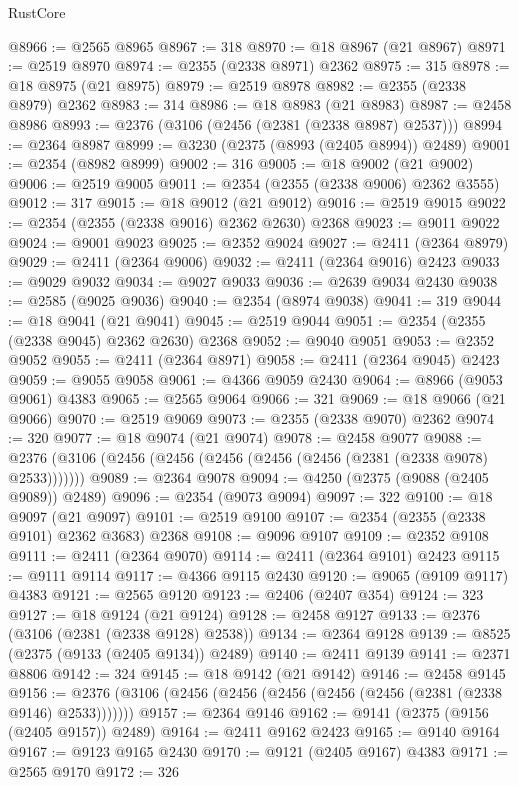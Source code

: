 \begin{lexlean}{RustCore}
\begin{coremodule}
@8966 := @2565 @8965
@8967 := 318
@8970 := @18 @8967 (@21 @8967)
@8971 := @2519 @8970
@8974 := @2355 (@2338 @8971) @2362
@8975 := 315
@8978 := @18 @8975 (@21 @8975)
@8979 := @2519 @8978
@8982 := @2355 (@2338 @8979) @2362
@8983 := 314
@8986 := @18 @8983 (@21 @8983)
@8987 := @2458 @8986
@8993 := @2376 (@3106 (@2456 (@2381 (@2338 @8987) @2537)))
@8994 := @2364 @8987
@8999 := @3230 (@2375 (@8993 (@2405 @8994)) @2489)
@9001 := @2354 (@8982 @8999)
@9002 := 316
@9005 := @18 @9002 (@21 @9002)
@9006 := @2519 @9005
@9011 := @2354 (@2355 (@2338 @9006) @2362 @3555)
@9012 := 317
@9015 := @18 @9012 (@21 @9012)
@9016 := @2519 @9015
@9022 := @2354 (@2355 (@2338 @9016) @2362 @2630) @2368
@9023 := @9011 @9022
@9024 := @9001 @9023
@9025 := @2352 @9024
@9027 := @2411 (@2364 @8979)
@9029 := @2411 (@2364 @9006)
@9032 := @2411 (@2364 @9016) @2423
@9033 := @9029 @9032
@9034 := @9027 @9033
@9036 := @2639 @9034 @2430
@9038 := @2585 (@9025 @9036)
@9040 := @2354 (@8974 @9038)
@9041 := 319
@9044 := @18 @9041 (@21 @9041)
@9045 := @2519 @9044
@9051 := @2354 (@2355 (@2338 @9045) @2362 @2630) @2368
@9052 := @9040 @9051
@9053 := @2352 @9052
@9055 := @2411 (@2364 @8971)
@9058 := @2411 (@2364 @9045) @2423
@9059 := @9055 @9058
@9061 := @4366 @9059 @2430
@9064 := @8966 (@9053 @9061) @4383
@9065 := @2565 @9064
@9066 := 321
@9069 := @18 @9066 (@21 @9066)
@9070 := @2519 @9069
@9073 := @2355 (@2338 @9070) @2362
@9074 := 320
@9077 := @18 @9074 (@21 @9074)
@9078 := @2458 @9077
@9088 := @2376 (@3106 (@2456 (@2456 (@2456 (@2456 (@2456 (@2381 (@2338 @9078) @2533)))))))
@9089 := @2364 @9078
@9094 := @4250 (@2375 (@9088 (@2405 @9089)) @2489)
@9096 := @2354 (@9073 @9094)
@9097 := 322
@9100 := @18 @9097 (@21 @9097)
@9101 := @2519 @9100
@9107 := @2354 (@2355 (@2338 @9101) @2362 @3683) @2368
@9108 := @9096 @9107
@9109 := @2352 @9108
@9111 := @2411 (@2364 @9070)
@9114 := @2411 (@2364 @9101) @2423
@9115 := @9111 @9114
@9117 := @4366 @9115 @2430
@9120 := @9065 (@9109 @9117) @4383
@9121 := @2565 @9120
@9123 := @2406 (@2407 @354)
@9124 := 323
@9127 := @18 @9124 (@21 @9124)
@9128 := @2458 @9127
@9133 := @2376 (@3106 (@2381 (@2338 @9128) @2538))
@9134 := @2364 @9128
@9139 := @8525 (@2375 (@9133 (@2405 @9134)) @2489)
@9140 := @2411 @9139
@9141 := @2371 @8806
@9142 := 324
@9145 := @18 @9142 (@21 @9142)
@9146 := @2458 @9145
@9156 := @2376 (@3106 (@2456 (@2456 (@2456 (@2456 (@2456 (@2381 (@2338 @9146) @2533)))))))
@9157 := @2364 @9146
@9162 := @9141 (@2375 (@9156 (@2405 @9157)) @2489)
@9164 := @2411 @9162 @2423
@9165 := @9140 @9164
@9167 := @9123 @9165 @2430
@9170 := @9121 (@2405 @9167) @4383
@9171 := @2565 @9170
@9172 := 326

\end{coremodule}
\end{lexlean}
